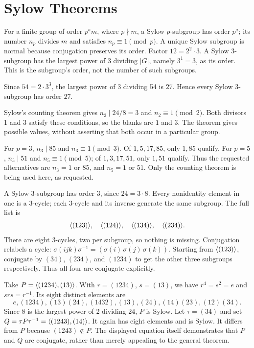 \section{Sylow Theorems}
For a finite group of order $p^a m$, where $p\nmid m$, a Sylow $p$-subgroup has order $p^a$; its number $n_p$ divides $m$ and satisfies $n_p\equiv1\pmod p$. A unique Sylow subgroup is normal because conjugation preserves its order.
Factor $12=2^2\cdot3$. A Sylow 3-subgroup has the largest power of 3 dividing $|G|$, namely $3^1=3$, as its order. This is the subgroup's order, not the number of such subgroups.

Since $54=2\cdot3^3$, the largest power of 3 dividing 54 is $27$. Hence every Sylow 3-subgroup has order $27$.

Sylow's counting theorem gives $n_2\mid24/8=3$ and $n_2\equiv1\pmod2$. Both divisors 1 and 3 satisfy these conditions, so the blanks are $1$ and $3$. The theorem gives possible values, without asserting that both occur in a particular group.

For $p=3$, $n_3\mid85$ and $n_3\equiv1\pmod3$. Of $1,5,17,85$, only $1,85$ qualify. For $p=5$, $n_5\mid51$ and $n_5\equiv1\pmod5$; of $1,3,17,51$, only $1,51$ qualify.
Thus the requested alternatives are $n_3=1$ or $85$, and $n_5=1$ or $51$. Only the counting theorem is being used here, as requested.

A Sylow 3-subgroup has order 3, since $24=3\cdot8$. Every nonidentity element in one is a 3-cycle; each 3-cycle and its inverse generate the same subgroup. The full list is
\[
\langle (123)\rangle,\quad\langle (124)\rangle,\quad\langle (134)\rangle,\quad\langle (234)\rangle.
\]
There are eight 3-cycles, two per subgroup, so nothing is missing.
Conjugation relabels a cycle: $\sigma(ijk)\sigma^{-1}=(\sigma(i)\,\sigma(j)\,\sigma(k))$.
Starting from $\langle (123)\rangle$, conjugate by $(34)$, $(234)$, and $(1234)$ to get the other three subgroups respectively. Thus all four are conjugate explicitly.

Take $P=\langle (1234),(13)\rangle$. With $r=(1234)$, $s=(13)$, we have $r^4=s^2=e$ and $srs=r^{-1}$. Its eight distinct elements are
\[
e,(1234),(13)(24),(1432),(13),(24),(14)(23),(12)(34).
\]
Since $8$ is the largest power of 2 dividing 24, $P$ is Sylow.
Let $\tau=(34)$ and set $Q=\tau P\tau^{-1}=\langle (1243),(14)\rangle$.
It again has eight elements and is Sylow. It differs from $P$ because $(1243)\notin P$.
The displayed equation itself demonstrates that $P$ and $Q$ are conjugate, rather than merely appealing to the general theorem.

